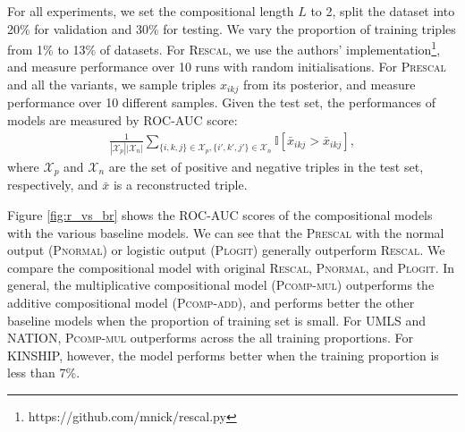 For all experiments, we set the compositional length $L$ to 2, split the dataset into 20\% for validation and 30\% for testing. We vary the proportion of training triples
from 1\% to 13\% of datasets. For \textsc{Rescal}, we use the authors' implementation\footnote{https://github.com/mnick/rescal.py}, and measure performance over 10 runs with random initialisations. For \textsc{Prescal} and all the variants, we sample triples $x_{ikj}$ from its posterior, and measure performance over 10 different samples.
Given the test set, the performances of models are measured by ROC-AUC score:
\begin{align}
\frac{1}{|\mathcal{X}_p|  |\mathcal{X}_n|} \sum_{\{i,k,j\} \in \mathcal{X}_p, \{i',k',j'\} \in \mathcal{X}_n} \mathbb{I}[\bar{x}_{ikj} > \bar{x}_{ikj}],
\end{align}
where $\mathcal{X}_p$ and $\mathcal{X}_n$ are the set of positive and negative triples in the test set, respectively, and $\bar{x}$ is a reconstructed triple.

Figure \ref{fig:r_vs_br} shows the ROC-AUC scores of the compositional models
with the various baseline models. We can see that the \textsc{Prescal} with
the normal output (\textsc{Pnormal}) or logistic output (\textsc{Plogit}) generally outperform \textsc{Rescal}.
We compare the compositional model with original \textsc{Rescal}, \textsc{Pnormal}, and \textsc{Plogit}.
In general, the multiplicative compositional model (\textsc{Pcomp-mul}) outperforms
the additive compositional model (\textsc{Pcomp-add}), and performs better the other baseline models
when the proportion of training set is small. For UMLS and NATION, \textsc{Pcomp-mul} outperforms
across the all training proportions.
For KINSHIP, however, the model performs better when the training proportion is less than 7\%.

